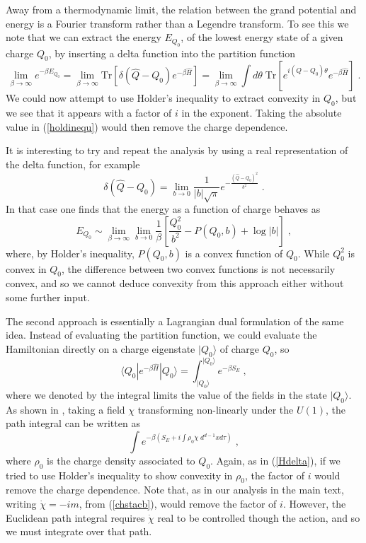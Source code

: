 \documentclass[11pt]{article}
\numberwithin{equation}{section}
\newcommand{\be}{\begin{equation}} \newcommand{\ee}{\end{equation}}
\begin{document}
Away from a thermodynamic limit, the relation between the grand potential and energy is a Fourier transform rather than a Legendre transform. To see this we note that we can extract the energy $E_{Q_0}$, of the lowest energy state of a given charge $Q_0$, by inserting a delta function into the partition function
\be
\lim_{\beta \rightarrow \infty} e^{-\beta E_{Q_0}} = \lim_{\beta \rightarrow \infty} \mathrm{Tr} \left[\delta\left(\hat{Q} - Q_0\right)e^{-\beta \hat{H}} \right] = \lim_{\beta \rightarrow \infty} \int d\theta \;\mathrm{Tr} \left[e^{i\left(\hat{Q} - Q_0\right)\theta}e^{-\beta \hat{H}} \right] \;.
\label{Hdelta}
\ee
We could now attempt to use Holder's inequality to extract convexity in $Q_0$, but we see that it appears with a factor of $i$ in the exponent. Taking the absolute value in (\ref{holdinequ}) would then remove the charge dependence. 

It is interesting to try and repeat the analysis by using a real representation of the delta function, for example
\be
\delta\left(\hat{Q} -Q_0\right) = \lim_{b \rightarrow 0} \frac{1}{|b|\sqrt{\pi}}e^{-\frac{\left(\hat{Q} -Q_0 \right)^2}{b^2}} \;.
\ee
In that case one finds that the energy as a function of charge behaves as
\be
E_{Q_0} \sim \lim_{\beta \rightarrow \infty} \lim_{b \rightarrow 0} \frac{1}{\beta}\left[ \frac{Q_0^2}{b^2} - P\left(Q_0,b\right) + \log |b| \right] \;,
\ee
where, by Holder's inequality, $P\left(Q_0,b\right)$ is a convex function of $Q_0$. While $Q_0^2$ is convex in $Q_0$, the difference between two convex functions is not necessarily convex, and so we cannot deduce convexity from this approach either without some further input.

The second approach is essentially a Lagrangian dual formulation of the same idea. Instead of evaluating the partition function, we could evaluate the Hamiltonian directly on a charge eigenstate $|Q_0\rangle$ of charge $Q_0$, so
\be
\langle Q_0 | e^{-\beta \hat{H}} | Q_0 \rangle = \int_{| Q_0 \rangle}^{| Q_0 \rangle} e^{-\beta S_E} \;,
\ee
where we denoted by the integral limits the value of the fields in the state $| Q_0 \rangle$. As shown in \cite{Badel:2019oxl}, taking a field $\chi$ transforming non-linearly under the $U(1)$, the path integral can be written as
\be
\int e^{-\beta \left(S_E + i \int \rho_0 \dot{\chi}  \;d^{d-1}x d\tau \right)} \;,
\ee
where $\rho_0$ is the charge density associated to $Q_0$. Again, as in (\ref{Hdelta}), if we tried to use Holder's inequality to show convexity in $\rho_0$, the factor of $i$ would remove the charge dependence. Note that, as in our analysis in the main text, writing $\dot{\chi} = -im$, from (\ref{chstacb}), would remove the factor of $i$. However, the Euclidean path integral requires $\dot{\chi}$ real to be controlled though the action, and so we must integrate over that path. 
\end{document}
